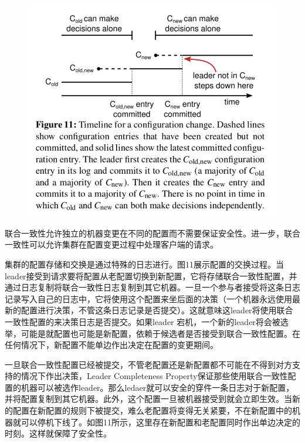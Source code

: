 \documentclass[journal]{IEEEtran}
\begin{document}
\begin{figure}[htbp]
\begin{center}
\includegraphics[width=1\linewidth]{./fig11.png}
\end{center}
\end{figure}
联合一致性允许独立的机器变更在不同的配置而不需要保证安全性。进一步，联合一致性可以允许集群在配置变更过程中处理客户端的请求。

集群的配置存储和交换是通过特殊的日志进行。图11展示配置的交换过程。当leader接受到请求要将配置从老配置切换到新配置，它将存储联合一致性配置，并通过日志复制将联合一致性日志复制到其它机器。一旦一个参与者接受将这条日志记录写入自己的日志中，它将使用这个配置来坐后面的决策（一个机器永远使用最新的配置进行决策，不管这条日志记录是否提交）。这就意味这leader将使用联合一致性配置的来决策日志是否提交。如果leader 宕机，一个新的leader将会被选举，可能是就配置也可能是新配置，依赖于候选者是否接受到联合一致性配置。在任何情况下，新配置不能单边作出决定在配置的变更期间。

一旦联合一致性配置已经被提交，不管老配置还是新配置都不可能在不得到对方支持的情况下作出决策，Leader Completeness Property保证那些使用联合一致性配置的机器可以被选作leader。那么ledaer就可以安全的穿件一条日志对于新配置，并将配置复制到其它机器。此外，这个配置一旦被机器接受到就会立即生效。当新的配置在新配置的规则下被提交，难么老配置将变得无关紧要，不在新配置中的机器就可以停机下线了。如图11所示，这里存在新配置和老配置同时作出单边决定的时刻。这样就保障了安全性。
\end{document}
